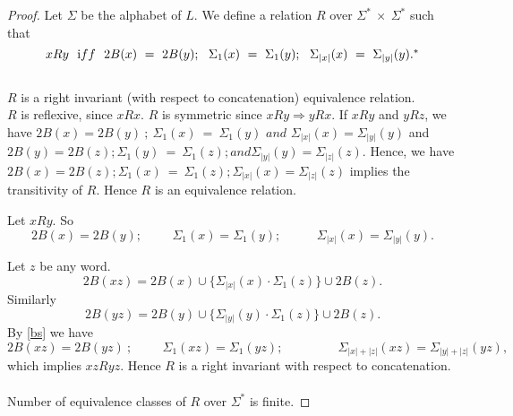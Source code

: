 \documentclass{llncs}
\newcommand{\sg}{\Sigma}
\newcommand{\cd}{\cdot}
\begin{document}
\begin{proof}
Let $ \Sigma $ be the alphabet of $L$.  We define a relation $R$
over $ \Sigma^*~\times~\Sigma^*$ such that \[ x R y~~ {\text iff~~}
2B(x)~=~2B(y); ~~\sg_{1} (x)~=~\sg_{1}(y);~~
\sg_{|x|}(x)~=~\sg_{|y|}(y). \symbolfootnote[1]{$\sg_i(w)$ is the
symbol in the $i^{th}$ position of the word $w$.}
\]
\\
 $R$ is a right invariant (with respect to
concatenation) equivalence relation.\\

 $R$ is reflexive, since $xRx$. $R$ is symmetric since
$xRy\Rightarrow yRx$. If $xRy$ and $yRz$, we have $2B(x)=2B(y)~;~
\sg_{1} (x)~=~\sg_{1}(y)$ $ and $ $\sg_{|x|}(x)=\sg_{|y|}(y)$ and
$2B(y)=2B(z); \sg_{1} (y)~=~\sg_{1}(z); and
\sg_{|y|}(y)=\sg_{|z|}(z)$. Hence, we have  $2B(x)=2B(z); \sg_{1}
(x)~=~\sg_{1}(z); \sg_{|x|}(x)=\sg_{|z|}(z)$ implies the
transitivity of $R$. Hence $R$ is an equivalence relation.

\par Let $xRy$. So
\begin{equation} \label{bs}
2B(x)=2B(y);\hspace{1cm}\sg_{1}(x)=\sg_{1}(y);\hspace{1cm}
~~\sg_{|x|}(x)=\sg_{|y|}(y).
\end{equation}

Let  $z$ be any word.
\[2B(xz)=2B(x)\cup\{\sg_{|x|}(x)\cd\sg_1(z)\}\cup2B(z).\]
Similarly
\[2B(yz)=2B(y)\cup\{\sg_{|y|}(y)\cd\sg_1(z)\}\cup2B(z).\]
By \ref{bs} we have
\[2B(xz)=2B(yz)~; \hspace{1cm} \sg_{1}(xz)=\sg_{1}(yz); \hspace{1cm} ~~~~~~~~
~\sg_{|x|+|z|}(xz)=\sg_{|y|+|z|}(yz),\] which implies $xzRyz$. Hence
$R$ is a right invariant with respect
to concatenation.\\\\

 Number of equivalence classes of $R$ over $
\Sigma^*$ is finite.


\end{proof}
\end{document}
